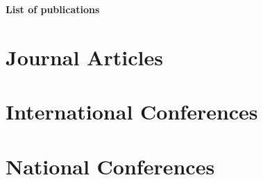 \documentclass[11pt,a4paper]{article}
\begin{document}
\begin{center}
    {\LARGE \textbf{List of publications}}
\end{center}

\section*{Journal Articles}
\nocite{soulej2025jaamas}
\printbibliography[keyword=journal, heading=none, sorting=ydnt]

\bigskip

\section*{International Conferences}
\nocite{soulej2025cloud}
\nocite{soule2024moise_marl}
\nocite{soule2024marl}
\nocite{soulej2023sim}
\printbibliography[keyword=international, heading=none, sorting=ydnt]

\bigskip

\section*{National Conferences}
\nocite{soule2025jfsma}
\nocite{soule2024outil}
\nocite{soule2024approche}
\nocite{soule2023jfsmathese}
\nocite{soule2023ressithese}
\nocite{soule2023rjciathese}
\printbibliography[keyword=national, heading=none, sorting=ydnt]
\end{document}
